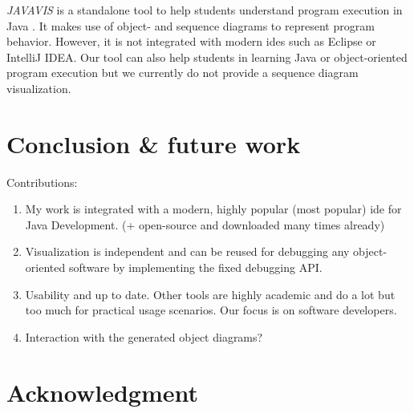 \documentclass[conference]{IEEEtran}
\newcommand{\intellij}{IntelliJ IDEA}
\begin{document}
\textit{JAVAVIS} is a standalone tool to help students understand program execution in Java \cite{oechsleJAVAVISAutomaticProgram2002}.
It makes use of object- and sequence diagrams to represent program behavior.
However, it is not integrated with modern \glspl*{ide} such as Eclipse or \intellij{}.
Our tool can also help students in learning Java or object-oriented program execution but we currently do not provide a sequence diagram visualization.

\section{Conclusion \& future work} \label{sec:conclusion}
Contributions:
\begin{enumerate}
    \item My work is integrated with a modern, highly popular (most popular) \gls*{ide} for Java Development. (+ open-source and downloaded many times already)
    \item Visualization is independent and can be reused for debugging any object-oriented software by implementing the fixed debugging API.
    \item Usability and up to date. Other tools are highly academic and do a lot but too much for practical usage scenarios. Our focus is on software developers.
    \item Interaction with the generated object diagrams?
\end{enumerate}


\cite{krauterBehavioralConsistencyHeterogeneous2021}

\section*{Acknowledgment}

\newpage



\end{document}
